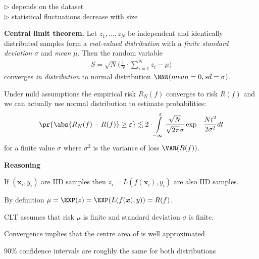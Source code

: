 \documentclass[landscape,footrule]{foils}
\renewcommand{\vec}[1]{\boldsymbol{#1}}
\begin{document}
\vspace*{-0.0cm}
$\triangleright$  depends on the dataset\\
$\triangleright$  statistical fluctuations decrease with size




\textbf{Central limit theorem.}
Let $z_1, \ldots, z_N$ be independent and identically distributed samples form a \emph{real-valued distribution} with a \emph{finite standard deviation} $\sigma$ and \emph{mean} $\mu$. Then the random variable 
\begin{align*}
S=\sqrt{N}\Biggl(\frac{1}{N}\cdot \sum_{i=1}^N z_i -\mu\Biggr)
\end{align*}
converges \emph{in distribution} to normal distribution $\NNN(mean=0, sd=\sigma)$.  



Under mild assumptions the empirical risk $R_N(f)$ converges to risk $R(f)$ and we can actually use normal distribution to estimate probabilities:
\begin{align*}
\pr{\abs{R_N(f)-R(f)}\geq \varepsilon} \lesssim 2\cdot \int\limits_{-\infty}^\varepsilon\frac{\sqrt{N}}{\sqrt{2\pi}\sigma}\exp{-\frac{N t^2}{2 \sigma^2}}dt
\end{align*}
for a finite value $\sigma$ where $\sigma^2$ is the variance of loss $\VAR(R(f))$.
\vspace*{1cm}

\textbf{Reasoning}
\begin{triangles}
\item If $(\vec{x}_i, y_i)$ are IID samples then $z_i=L(f(\vec{x}_i), y_i)$ are also IID samples.
\item By definition $\mu=\EXP(z)=\EXP(L(f(\vec{x}),y))=R(f)$.
\item CLT assumes that risk $\mu$ is finite and standard deviation $\sigma$ is finite.
\end{triangles}
\bigskip




\vspace*{-0.5cm}

Convergence implies that the centre area of is well approximated 
\begin{triangles}
\item 90\% confidence intervals are roughly the same for both distributions
\end{triangles}
\end{document}
